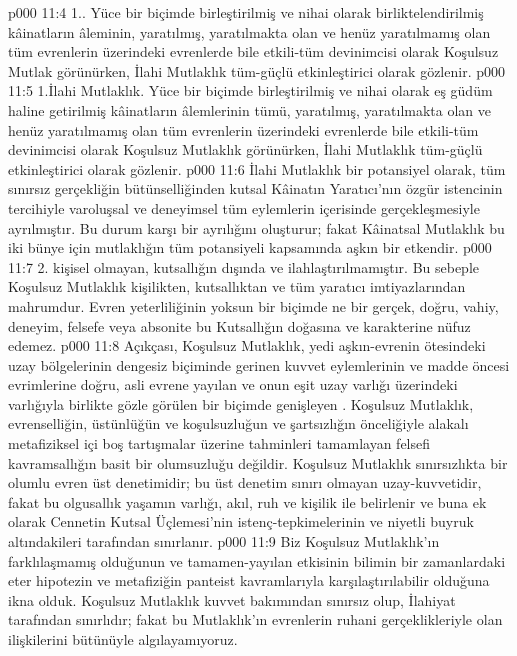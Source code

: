 \vs p000 11:4 1.\bibnobreakspace {}. Yüce bir biçimde birleştirilmiş ve nihai olarak birliktelendirilmiş kâinatların âleminin, yaratılmış, yaratılmakta olan ve henüz yaratılmamış olan tüm evrenlerin üzerindeki evrenlerde bile etkili\hyp{}tüm devinimcisi olarak Koşulsuz Mutlak görünürken, İlahi Mutlaklık tüm\hyp{}güçlü etkinleştirici olarak gözlenir.
\vs p000 11:5 1.\bibnobreakspace İlahi Mutlaklık. Yüce bir biçimde birleştirilmiş ve nihai olarak eş güdüm haline getirilmiş kâinatların âlemlerinin tümü, yaratılmış, yaratılmakta olan ve henüz yaratılmamış olan tüm evrenlerin üzerindeki evrenlerde bile etkili\hyp{}tüm devinimcisi olarak Koşulsuz Mutlaklık görünürken, İlahi Mutlaklık tüm\hyp{}güçlü etkinleştirici olarak gözlenir.
\vs p000 11:6 İlahi Mutlaklık bir potansiyel olarak, tüm sınırsız gerçekliğin bütünselliğinden kutsal Kâinatın Yaratıcı’nın özgür istencinin tercihiyle varoluşsal ve deneyimsel tüm eylemlerin içerisinde gerçekleşmesiyle ayrılmıştır. Bu durum  karşı bir ayrılığını oluşturur; fakat Kâinatsal Mutlaklık bu iki bünye için mutlaklığın tüm potansiyeli kapsamında aşkın bir etkendir.
\vs p000 11:7 2.\bibnobreakspace {} kişisel olmayan, kutsallığın dışında ve ilahlaştırılmamıştır. Bu sebeple Koşulsuz Mutlaklık kişilikten, kutsallıktan ve tüm yaratıcı imtiyazlarından mahrumdur. Evren yeterliliğinin yoksun bir biçimde ne bir gerçek, doğru, vahiy, deneyim, felsefe veya absonite bu Kutsallığın doğasına ve karakterine nüfuz edemez.
\vs p000 11:8 Açıkçası, Koşulsuz Mutlaklık, yedi aşkın\hyp{}evrenin ötesindeki uzay bölgelerinin dengesiz biçiminde gerinen kuvvet eylemlerinin ve madde öncesi evrimlerine doğru, asli evrene yayılan ve onun eşit uzay varlığı üzerindeki varlığıyla birlikte gözle görülen bir biçimde genişleyen . Koşulsuz Mutlaklık, evrenselliğin, üstünlüğün ve koşulsuzluğun ve şartsızlığın önceliğiyle alakalı metafiziksel içi boş tartışmalar üzerine tahminleri tamamlayan felsefi kavramsallığın basit bir olumsuzluğu değildir. Koşulsuz Mutlaklık sınırsızlıkta bir olumlu evren üst denetimidir; bu üst denetim sınırı olmayan uzay\hyp{}kuvvetidir, fakat bu olgusallık yaşamın varlığı, akıl, ruh ve kişilik ile belirlenir ve buna ek olarak Cennetin Kutsal Üçlemesi’nin istenç\hyp{}tepkimelerinin ve niyetli buyruk altındakileri tarafından sınırlanır.
\vs p000 11:9 Biz Koşulsuz Mutlaklık’ın farklılaşmamış olduğunun ve tamamen\hyp{}yayılan etkisinin bilimin bir zamanlardaki eter hipotezin ve metafiziğin panteist kavramlarıyla karşılaştırılabilir olduğuna ikna olduk. Koşulsuz Mutlaklık kuvvet bakımından sınırsız olup, İlahiyat tarafından sınırlıdır; fakat bu Mutlaklık’ın evrenlerin ruhani gerçeklikleriyle olan ilişkilerini bütünüyle algılayamıyoruz.
